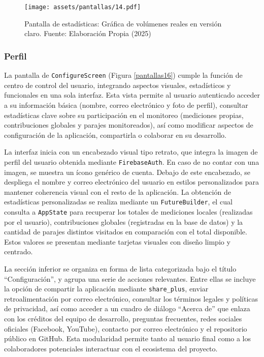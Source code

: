 \begin{figure}[h!]
\centering
  \texttt{[image: assets/pantallas/14.pdf]}
  \caption{Pantalla de estadísticas: Gráfica de volúmenes reales en versión claro. Fuente: Elaboración Propia (2025)}
  \label{pantallas14}
\end{figure}

\newpage
\subsubsection*{Perfil} 

La pantalla de \texttt{ConfigureScreen} (Figura \ref{pantallas16}) cumple la función de centro de control del usuario, integrando aspectos visuales, estadísticos y funcionales en una sola interfaz. Esta vista permite al usuario autenticado acceder a su información básica (nombre, correo electrónico y foto de perfil), consultar estadísticas clave sobre su participación en el monitoreo (mediciones propias, contribuciones globales y parajes monitoreados), así como modificar aspectos de configuración de la aplicación, compartirla o colaborar en su desarrollo.

La interfaz inicia con un encabezado visual tipo retrato, que integra la imagen de perfil del usuario obtenida mediante \texttt{FirebaseAuth}. En caso de no contar con una imagen, se muestra un ícono genérico de cuenta. Debajo de este encabezado, se despliega el nombre y correo electrónico del usuario en estilos personalizados para mantener coherencia visual con el resto de la aplicación. La obtención de estadísticas personalizadas se realiza mediante un \texttt{FutureBuilder}, el cual consulta a \texttt{AppState} para recuperar los totales de mediciones locales (realizadas por el usuario), contribuciones globales (registradas en la base de datos) y la cantidad de parajes distintos visitados en comparación con el total disponible. Estos valores se presentan mediante tarjetas visuales con diseño limpio y centrado.

La sección inferior se organiza en forma de lista categorizada bajo el título ``Configuración'', y agrupa una serie de acciones relevantes. Entre ellas se incluye la opción de compartir la aplicación mediante \texttt{share\_plus}, enviar retroalimentación por correo electrónico, consultar los términos legales y políticas de privacidad, así como acceder a un cuadro de diálogo “Acerca de” que enlaza con los créditos del equipo de desarrollo, preguntas frecuentes, redes sociales oficiales (Facebook, YouTube), contacto por correo electrónico y el repositorio público en GitHub. Esta modularidad permite tanto al usuario final como a los colaboradores potenciales interactuar con el ecosistema del proyecto.

